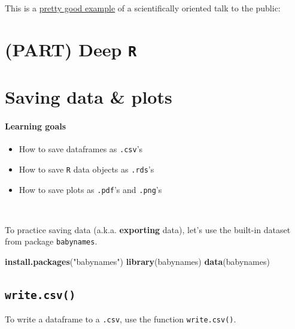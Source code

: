\documentclass[
]{book}
\newenvironment{Shaded}{\begin{snugshade}}{\end{snugshade}}
\newcommand{\KeywordTok}[1]{\textcolor[rgb]{0.13,0.29,0.53}{\textbf{#1}}}
\newcommand{\NormalTok}[1]{#1}
\newcommand{\StringTok}[1]{\textcolor[rgb]{0.31,0.60,0.02}{#1}}
\providecommand{\tightlist}{%
  \setlength{\itemsep}{0pt}\setlength{\parskip}{0pt}}
\begin{document}
This is a \href{https://www.youtube.com/watch?v=mae2eugjUsU}{pretty good example} of a scientifically oriented talk to the public:

\hypertarget{part-deep-r}{%
\chapter*{\texorpdfstring{(PART) Deep \texttt{R}}{(PART) Deep R}}\label{part-deep-r}}

\hypertarget{saving-data-plots}{%
\chapter{Saving data \& plots}\label{saving-data-plots}}

\hypertarget{learning-goals-19}{%
\subsubsection*{Learning goals}\label{learning-goals-19}}

\begin{itemize}
\tightlist
\item
  How to save dataframes as \texttt{.csv}'s
\item
  How to save \texttt{R} data objects as \texttt{.rds}'s
\item
  How to save plots as \texttt{.pdf}'s and \texttt{.png}'s
\end{itemize}

~

To practice saving data (a.k.a. \textbf{exporting} data), let's use the built-in dataset from package \texttt{babynames}.

\begin{Shaded}
\begin{Highlighting}[]
\KeywordTok{install.packages}\NormalTok{(}\StringTok{"babynames"}\NormalTok{)}
\KeywordTok{library}\NormalTok{(babynames)}
\KeywordTok{data}\NormalTok{(babynames)}
\end{Highlighting}
\end{Shaded}

\hypertarget{write.csv}{%
\section*{\texorpdfstring{\texttt{write.csv()}}{write.csv()}}\label{write.csv}}

To write a dataframe to a \texttt{.csv}, use the function \texttt{write.csv()}.
\end{document}
